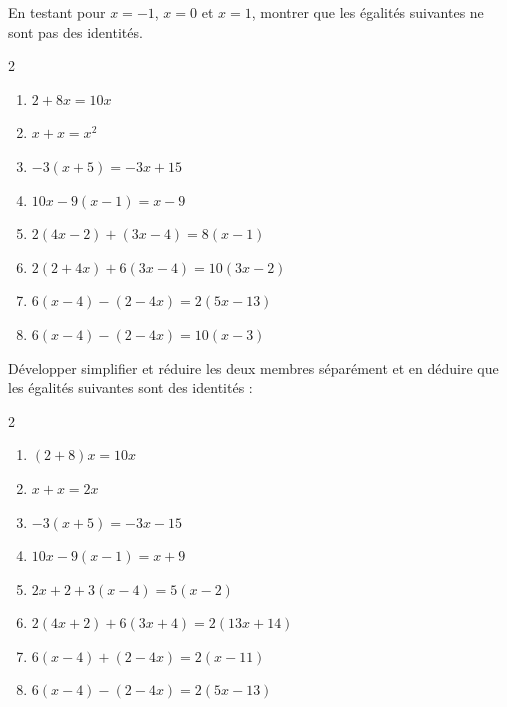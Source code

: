 \documentclass[main.tex]{subfiles}
\begin{document}
\begin{exercise} En testant pour $x=-1$, $x=0$ et $x=1$, montrer que les égalités suivantes ne sont pas des identités.
	\begin{multicols}{2} 
		\begin{enumerate}[label={\alph*)}, align=left,   leftmargin=*] 
			\item $2+8x=10x$
			\item $x+x=x^2$
			\item $-3(x+5)=-3x+15$
			\item $10x-9(x-1)=x-9$
			\item $2(4x-2)+(3x-4)=8(x-1)$ 
			\item $2(2+4x)+6(3x-4)=10(3x-2)$  
			\item $6(x-4)-(2-4x)=2(5x-13)$ 
			\item $6(x-4)-(2-4x)=10(x-3)$   
		\end{enumerate} 
	\end{multicols} 
\end{exercise}  
\begin{exercise} Développer simplifier et réduire les deux membres séparément et en déduire que les égalités suivantes sont des identités :
	\begin{multicols}{2} 
		\begin{enumerate}[label={\alph*)}, align=left,   leftmargin=*] 
			\item $(2+8)x=10x$
			\item $x+x=2x$
			\item $-3(x+5)=-3x-15$
			\item $10x-9(x-1)=x+9$
			\item $2x+2+3(x-4)=5(x-2)$  
			\item $2(4x+2)+6(3x+4)=2(13x+14)$  
			\item $6(x-4)+(2-4x)=2(x-11)$ 
			\item $6(x-4)-(2-4x)=2(5x-13)$
		\end{enumerate} 
	\end{multicols} 
\end{exercise}  
\end{document}
